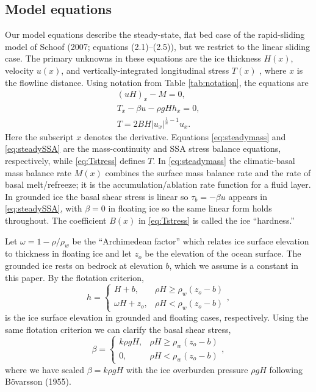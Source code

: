 \documentclass[twocolumn]{igs}
\renewcommand{\dh}{\fontencoding{T1}\selectfont{\symbol{240}}}
\newcommand{\citebod}{B\"o\dh varsson (1955)\nocite{Bodvardsson}\xspace}
\begin{document}
\subsection*{Model equations}  Our model equations describe the steady-state, flat bed case of the rapid-sliding model of Schoof\nocite{SchoofMarine1} (2007; equations (2.1)--(2.5)), but we restrict to the linear sliding case.  The primary unknowns in these equations are the ice thickness $H(x)$, velocity $u(x)$, and vertically-integrated longitudinal stress $T(x)$ \citep{SchoofStream}, where $x$ is the flowline distance.  Using notation from Table \ref{tab:notation}, the equations are
\begin{gather}
(uH)_x - M = 0, \label{eq:steadymass} \\
T_x - \beta u - \rho g H h_x = 0, \label{eq:steadySSA} \\
T = 2 B H |u_x|^{\frac{1}{n}-1} u_x. \label{eq:Tstress}
\end{gather}
Here the subscript $x$ denotes the derivative.  Equations \eqref{eq:steadymass} and \eqref{eq:steadySSA} are the mass-continuity and SSA stress balance equations, respectively, while \eqref{eq:Tstress} defines $T$.  In \eqref{eq:steadymass} the climatic-basal mass balance rate $M(x)$ \citep{massbalanceglossary} combines the surface mass balance rate and the rate of basal melt/refreeze; it is the accumulation/ablation rate function for a fluid layer.  In grounded ice the basal shear stress is linear so $\tau_b = - \beta u$ \citep{MacAyeal} appears in \eqref{eq:steadySSA}, with $\beta=0$ in floating ice so the same linear form holds throughout.  The coefficient $B(x)$ in \eqref{eq:Tstress} is called the ice ``hardness.''

Let $\omega = 1 - \rho/\rho_w$ be the ``Archimedean factor'' which relates ice surface elevation to thickness in floating ice and let $z_o$ be the elevation of the ocean surface.  The grounded ice rests on bedrock at elevation $b$, which we assume is a constant in this paper.  By the flotation criterion,
\begin{equation}
h = \begin{cases} H+b,            & \rho H \ge \rho_w (z_o - b) \\
                  \omega H + z_o, & \rho H < \rho_w (z_o - b) \end{cases}, \label{eq:surface}
\end{equation}
is the ice surface elevation in grounded and floating cases, respectively.  Using the same flotation criterion we can clarify the basal shear stress,
\begin{equation}
\beta = \begin{cases} k \rho g H,    & \rho H \ge \rho_w (z_o - b) \\
                      0,          & \rho H < \rho_w (z_o - b) \end{cases}, \label{eq:betafull}
\end{equation}
where we have scaled $\beta = k \rho g H$ with the ice overburden pressure $\rho g H$ following \citebod.
\end{document}
